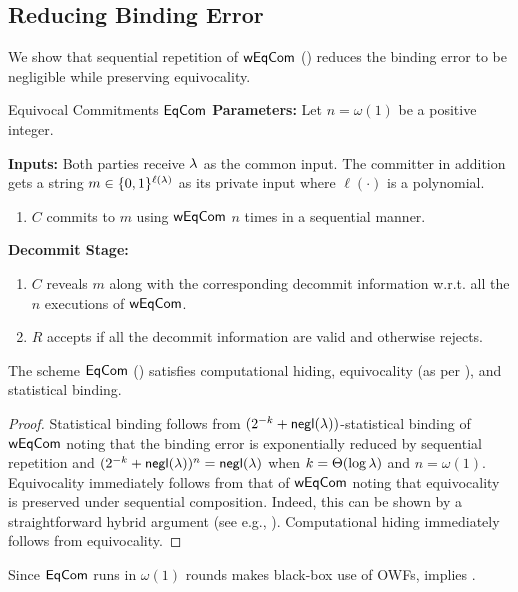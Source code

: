 \subsection{Reducing Binding Error}
We show that sequential repetition of $\mathsf{wEqCom}$ () reduces the binding error to be negligible while preserving equivocality. 
\begin{ProtocolBox}[label={protocol:EqCom}]{Equivocal Commitments $\mathsf{EqCom}$}
{\bf Parameters:} Let $n=\omega(1)$ be a positive integer.

{\bf Inputs:} Both parties receive $\lambda$ as the common input. The committer in addition gets a string $m\in \{0,1\}^{\ell(\lambda)}$ as its private input where $\ell(\cdot)$ is a polynomial.

\begin{enumerate}
\item 
$C$ commits to $m$ using $\mathsf{wEqCom}$ $n$ times in a sequential manner. 
\end{enumerate}
{\bf Decommit Stage:} 
\begin{enumerate}
\item $C$ reveals $m$ along with the corresponding decommit information w.r.t. all the $n$ executions of $\mathsf{wEqCom}$. 
\item  $R$ accepts if all the decommit information are valid  and otherwise rejects. 
\end{enumerate}
\end{ProtocolBox}
\begin{theorem}\label{thm:security-eqcom}
The scheme $\mathsf{EqCom}$ () satisfies computational hiding, equivocality (as per ), and statistical binding. 
\end{theorem}
\begin{proof}
Statistical binding follows from $(2^{-k}+\mathsf{negl}(\lambda))$-statistical binding of $\mathsf{wEqCom}$ noting that the binding error is exponentially reduced by sequential repetition  and $(2^{-k}+\mathsf{negl}(\lambda))^n=\mathsf{negl}(\lambda)$ when $k=\Theta(\log \lambda)$ and $n=\omega(1)$. 
Equivocality immediately follows from that of $\mathsf{wEqCom}$ noting that equivocality is preserved under sequential composition. Indeed, this can be shown by a straightforward hybrid argument (see e.g., \cite{C:BCKM21b}). 
Computational hiding immediately follows from equivocality.  
\end{proof}

Since $\mathsf{EqCom}$ runs in $\omega(1)$ rounds makes black-box use of OWFs,  implies . 

